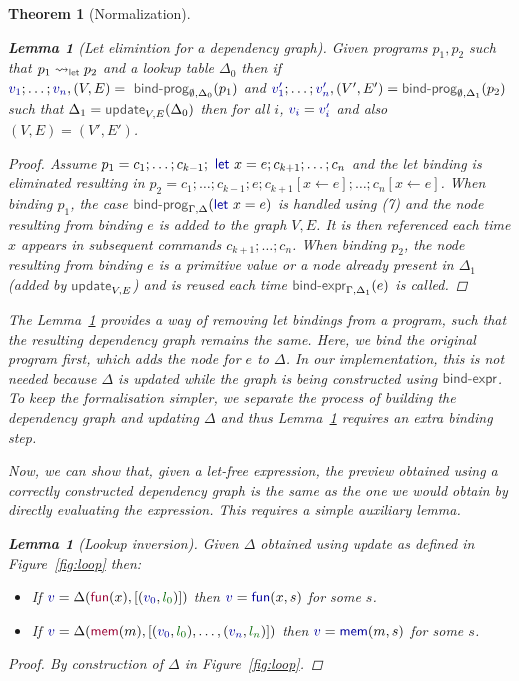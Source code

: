 \documentclass[acmsmall,anonymous,fleqn]{acmart}\settopmatter{printfolios=false,printccs=false,printacmref=false}
\newcounter{thc}
\theoremstyle{plain}
\newtheorem{lem}[thc]{Lemma}
\newtheorem{theorem}[thc]{Theorem}
\theoremstyle{definition}
\newcommand{\ident}[1]{\textnormal{\textcolor{idclr}{\sffamily #1}}}
\newcommand{\kvd}[1]{\textnormal{\textcolor{kvdclr}{\sffamily #1}}}
\newcommand{\bndclr}[1]{\textcolor{kvdclr}{#1}}
\newcommand{\blblclr}[1]{\textcolor{numclr}{#1}}
\newcommand{\bnd}[1]{\textnormal{\textcolor{kvdclr}{\sffamily #1}}}
\newcommand{\bknd}[1]{\textnormal{\textcolor{prepclr}{\sffamily #1}}}
\begin{document}
\begin{theorem}[Normalization]
\begin{lem}[Let elimintion for a dependency graph]
\label{thm:let-grp-elimination}
Given programs $p_1, p_2$ such that $p_1 \rightsquigarrow_\ident{let} p_2$ and a lookup table
$\Delta_0$ then if $\bndclr{v_1}; \ldots; \bndclr{v_n}, (V, E) = \ident{bind-prog}_{\emptyset, \Delta_0}(p_1)$ and
$\bndclr{v'_1};\ldots;\bndclr{v'_n}, (V', E') = \ident{bind-prog}_{\emptyset, \Delta_1}(p_2)$ such that $\Delta_1 = \ident{update}_{V, E}(\Delta_0)$
then for all $i$, $\bndclr{v_i} = \bndclr{v'_i}$ and also $(V, E) = (V', E')$.
\end{lem}
\begin{proof}
Assume $p_1 = c_1; \ldots; c_{k-1}; \kvd{let}~x=e; c_{k+1};\ldots; c_n$ and the let binding is
eliminated resulting in $p_2 = c_1; \ldots; c_{k-1}; e; c_{k+1}[x\leftarrow e];\ldots; c_n[x\leftarrow e]$.
When binding $p_1$, the case $\ident{bind-prog}_{\Gamma,\Delta}(\kvd{let}~x=e)$ is handled using (7)
and the node resulting from binding $e$ is added to the graph $V, E$. It is then referenced each
time $x$ appears in subsequent commands $c_{k+1}; \ldots; c_n$.
When binding $p_2$, the node resulting from binding $e$ is a primitive value or a node already
present in $\Delta_1$ (added by $\ident{update}_{V, E}$) and is reused each time
$\ident{bind-expr}_{\Gamma,\Delta_1}(e)$ is called.
\end{proof}

The Lemma~\ref{thm:let-grp-elimination} provides a way of removing let bindings from a program,
such that the resulting dependency graph remains the same. Here, we bind the original program
first, which adds the node for $e$ to $\Delta$. In our implementation, this is not needed
because $\Delta$ is updated while the graph is being constructed using $\ident{bind-expr}$.
To keep the formalisation simpler, we separate the process of building the dependency graph
and updating $\Delta$ and thus Lemma~\ref{thm:let-grp-elimination} requires an extra binding step.

Now, we can show that, given a let-free expression, the preview obtained using a correctly
constructed dependency graph is the same as the one we would obtain by directly evaluating the
expression. This requires a simple auxiliary lemma.

\begin{lem}[Lookup inversion]
\label{thm:lemma-lookup}
Given $\Delta$ obtained using \ident{update} as defined in Figure~\ref{fig:loop} then:
\begin{itemize}
\raggedright
\item[--] If $\bndclr{v}=\Delta(\bknd{fun}(x),[(\bndclr{v_0}, \blblclr{l_0})])$
then $\bndclr{v}=\bnd{fun}(x, s)$ for some $s$.
\item[--] If $\bndclr{v}=\Delta(\bknd{mem}(m),[(\bndclr{v_0}, \blblclr{l_0}), \ldots, (\bndclr{v_n}, \blblclr{l_n})])$
then $\bndclr{v}=\bnd{mem}(m, s)$ for some $s$.
\end{itemize}
\end{lem}
\begin{proof}
By construction of $\Delta$ in Figure~\ref{fig:loop}.
\end{proof}


\end{theorem}
\end{document}
